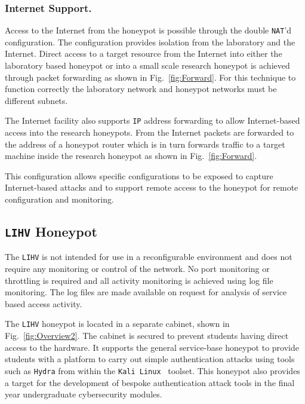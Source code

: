 \documentclass{llncs}
\begin{document}
\subsubsection{Internet Support.}

Access to the Internet from the honeypot is possible through the double
\texttt{NAT}'d configuration. The configuration provides isolation from the
laboratory and the Internet. Direct access to a target resource from the
Internet into either the laboratory based honeypot or into a small scale
research honeypot is achieved through packet forwarding as shown in
Fig.~\ref{fig:Forward}. For this technique to function correctly the
laboratory network and honeypot networks must be different subnets.

The Internet facility also supports \texttt{IP} address forwarding to allow
Internet-based access into the research honeypots. From the Internet packets
are forwarded to the address of a honeypot router which is in turn forwards
traffic to a target machine inside the research honeypot as shown in
Fig.~\ref{fig:Forward}.

This configuration allows specific configurations to be exposed to capture
Internet-based attacks and to support remote access to the honeypot for remote
configuration and monitoring.

\subsection{\texttt{LIHV} Honeypot}

The \texttt{LIHV} is not intended for use in a reconfigurable environment and
does not require any monitoring or control of the network. No port monitoring
or throttling is required and all activity monitoring is achieved using log
file monitoring. The log files are made available on request for analysis of
service based access activity.

The \texttt{LIHV} honeypot is located in a separate cabinet, shown in
Fig.~\ref{fig:Overview2}. The cabinet is secured to prevent students having
direct access to the hardware. It supports the general service-base honeypot to
provide students with a platform to carry out simple authentication attacks
using tools such as \texttt{Hydra} from within the \texttt{Kali
Linux}~\cite{OS:17} toolset. This honeypot also provides a target for the
development of bespoke authentication attack tools in the final year
undergraduate cybersecurity modules.
\end{document}
